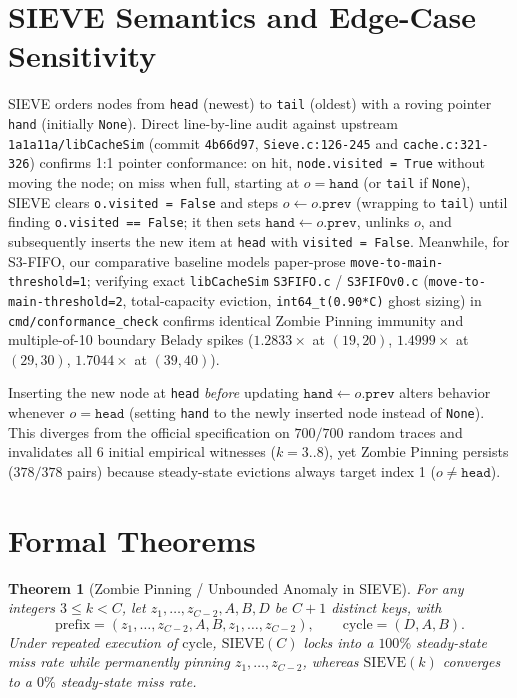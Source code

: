 \documentclass[10pt,twocolumn]{article}
\newtheorem{theorem}{Theorem}
\begin{document}
\section{SIEVE Semantics and Edge-Case Sensitivity}
SIEVE orders nodes from \texttt{head} (newest) to \texttt{tail} (oldest) with a roving pointer \texttt{hand} (initially \texttt{None}). Direct line-by-line audit against upstream \texttt{1a1a11a/libCacheSim} (commit \texttt{4b66d97}, \texttt{Sieve.c:126-245} and \texttt{cache.c:321-326}) confirms 1:1 pointer conformance: on hit, \texttt{node.visited = True} without moving the node; on miss when full, starting at $o = \texttt{hand}$ (or \texttt{tail} if \texttt{None}), SIEVE clears \texttt{o.visited = False} and steps $o \leftarrow o.\texttt{prev}$ (wrapping to \texttt{tail}) until finding \texttt{o.visited == False}; it then sets $\texttt{hand} \leftarrow o.\texttt{prev}$, unlinks $o$, and subsequently inserts the new item at \texttt{head} with \texttt{visited = False}. Meanwhile, for S3-FIFO, our comparative baseline models paper-prose \texttt{move-to-main-threshold=1}; verifying exact \texttt{libCacheSim} \texttt{S3FIFO.c} / \texttt{S3FIFOv0.c} (\texttt{move-to-main-threshold=2}, total-capacity eviction, \texttt{int64\_t(0.90*C)} ghost sizing) in \texttt{cmd/conformance\_check} confirms identical Zombie Pinning immunity and multiple-of-10 boundary Belady spikes ($1.2833\times$ at $(19,20)$, $1.4999\times$ at $(29,30)$, $1.7044\times$ at $(39,40)$).

Inserting the new node at \texttt{head} \emph{before} updating $\texttt{hand} \leftarrow o.\texttt{prev}$ alters behavior whenever $o = \texttt{head}$ (setting \texttt{hand} to the newly inserted node instead of \texttt{None}). This diverges from the official specification on $700/700$ random traces and invalidates all 6 initial empirical witnesses ($k=3..8$), yet Zombie Pinning persists ($378/378$ pairs) because steady-state evictions always target index 1 ($o \ne \texttt{head}$).

\section{Formal Theorems}

\begin{theorem}[Zombie Pinning / Unbounded Anomaly in SIEVE]
For any integers $3 \le k < C$, let $z_1, \dots, z_{C-2}, A, B, D$ be $C+1$ distinct keys, with
\[
\mathrm{prefix} = (z_1, \dots, z_{C-2}, A, B, z_1, \dots, z_{C-2}), \qquad \mathrm{cycle} = (D, A, B).
\]
Under repeated execution of $\mathrm{cycle}$, $\mathrm{SIEVE}(C)$ locks into a $100\%$ steady-state miss rate while permanently pinning $z_1, \dots, z_{C-2}$, whereas $\mathrm{SIEVE}(k)$ converges to a $0\%$ steady-state miss rate.
\end{theorem}
\end{document}
